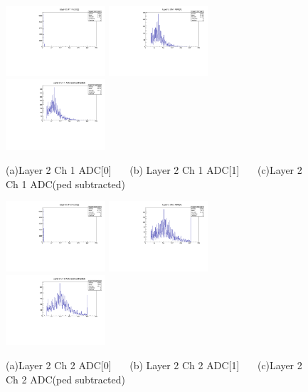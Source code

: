 \documentclass[a4paper,11pt]{article}
\theoremstyle{mytheor}
\begin{document}
\begin{figure}[H] 
\vspace*{-0.3cm} 
\includegraphics[width=0.33\textwidth,scale=0.5,trim=0 0 0 0,clip]{plotsdir/file0_muons-Layer2_Ch1_adc0-1.pdf} 
\includegraphics[width=0.33\textwidth,scale=0.5,trim=0 0 0 0,clip]{plotsdir/file0_muons-Layer2_Ch1_adc1-1.pdf} 
\includegraphics[width=0.33\textwidth,scale=0.5,trim=0 0 0 0,clip]{plotsdir/file0_muons-Layer2_Ch1_adcPedsub-1.pdf} 
\caption{(a)Layer 2 Ch 1 ADC[0] ~~~(b) Layer 2 Ch 1 ADC[1] ~~~(c)Layer 2 Ch 1 ADC(ped subtracted) } 
\end{figure} 
\clearpage 
\begin{figure}[H] 
\vspace*{-0.3cm} 
\includegraphics[width=0.33\textwidth,scale=0.5,trim=0 0 0 0,clip]{plotsdir/file0_muons-Layer2_Ch2_adc0-1.pdf} 
\includegraphics[width=0.33\textwidth,scale=0.5,trim=0 0 0 0,clip]{plotsdir/file0_muons-Layer2_Ch2_adc1-1.pdf} 
\includegraphics[width=0.33\textwidth,scale=0.5,trim=0 0 0 0,clip]{plotsdir/file0_muons-Layer2_Ch2_adcPedsub-1.pdf} 
\caption{(a)Layer 2 Ch 2 ADC[0] ~~~(b) Layer 2 Ch 2 ADC[1] ~~~(c)Layer 2 Ch 2 ADC(ped subtracted) } 
\end{figure} 
\end{document}
